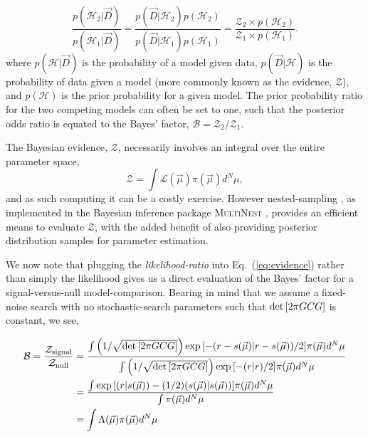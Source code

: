 \documentclass[prd,showpacs,nofootinbib]{revtex4}
\begin{document}
\begin{equation}
\frac{p(\mathcal{H}_2|\vec D)}{p(\mathcal{H}_1|\vec D)} = \frac{p(\vec D|\mathcal{H}_2)p(\mathcal{H}_2)}{p(\vec D|\mathcal{H}_1)p(\mathcal{H}_1)}=\frac{\mathcal{Z}_2\times p(\mathcal{H}_2)}{\mathcal{Z}_1\times p(\mathcal{H}_1)}.
\end{equation}
where $p(\mathcal{H}|\vec D)$ is the probability of a model given data, $p(\vec D|\mathcal{H})$ is the probability of data given a model (more commonly known as the evidence, $\mathcal{Z}$), and $p(\mathcal{H})$ is the prior probability for a given model. The prior probability ratio for the two competing models can often be set to one, such that the posterior odds ratio is equated to the Bayes' factor, $\mathcal{B} = \mathcal{Z}_2/\mathcal{Z}_1$.

The Bayesian evidence, $\mathcal{Z}$, necessarily involves an integral over the entire parameter space, 
\begin{equation}\label{eq:evidence}
\mathcal{Z} = \int \mathcal{L}(\vec\mu)\pi(\vec\mu)d^N\mu,
\end{equation}
and as such computing it can be a costly exercise. However nested-sampling \citep{skilling2004}, as implemented in the Bayesian inference package \textsc{MultiNest} \citep{feroz2008,feroz2009,INS_Multinest}, provides an efficient means to evaluate $\mathcal{Z}$, with the added benefit of also providing posterior distribution samples for parameter estimation.

We now note that plugging the {\it likelihood-ratio} into Eq.\ (\ref{eq:evidence}) rather than simply the likelihood gives us a direct evaluation of the Bayes' factor for a signal-versus-null model-comparison. Bearing in mind that we assume a fixed-noise search with no stochastic-search parameters such that ${\rm det}\left[2\pi GCG\right]$ is constant, we see,

\begin{align}
\mathcal{B} = \frac{\mathcal{Z}_{\rm signal}}{\mathcal{Z}_{\rm null}} &= \frac{\int \left(1/\sqrt{{\rm det}\left[2\pi GCG\right]}\right)\exp{\left[ -(r-s(\vec\mu)|r-s(\vec\mu))/2\right]}\pi(\vec\mu)d^N\mu}{\int \left(1/\sqrt{{\rm det}\left[2\pi GCG\right]}\right)\exp{\left[ -(r|r)/2\right]}\pi(\vec\mu)d^N\mu} \\\nonumber
&= \frac{\int \exp{\left[ (r|s(\vec\mu)) - (1/2)(s(\vec\mu)|s(\vec\mu))\right]}\pi(\vec\mu)d^N\mu}{\int\pi(\vec\mu)d^N\mu} \\\nonumber
&= \int \Lambda(\vec\mu)\pi(\vec\mu)d^N\mu
\end{align}
\end{document}
